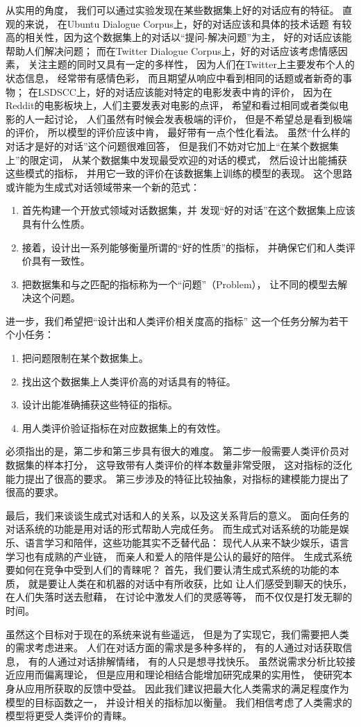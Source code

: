从实用的角度，
我们可以通过实验发现在某些数据集上好的对话应有的特征。
直观的来说，
在Ubuntu Dialogue Corpus上，好的对话应该和具体的技术话题
有较高的相关性，因为这个数据集上的对话以“提问-解决问题”为主，
好的对话应该能帮助人们解决问题；
而在Twitter Dialogue Corpus上，好的对话应该考虑情感因素，
关注主题的同时又具有一定的多样性，
因为人们在Twitter上主要发布个人的状态信息，
经常带有感情色彩，
而且期望从响应中看到相同的话题或者新奇的事物；
在LSDSCC上，好的对话应该能对特定的电影发表中肯的评价，
因为在Reddit的电影板块上，人们主要发表对电影的点评，
希望和看过相同或者类似电影的人一起讨论，
人们虽然有时候会发表极端的评价，
但是不希望总是看到极端的评价，
所以模型的评价应该中肯，
最好带有一点个性化看法。
虽然“什么样的对话才是好的对话”这个问题很难回答，
但是我们不妨对它加上“在某个数据集上”的限定词，
从某个数据集中发现最受欢迎的对话的模式，
然后设计出能捕获这些模式的指标，
并用它一致的评价在该数据集上训练的模型的表现。
这个思路或许能为生成式对话领域带来一个新的范式：
\begin{enumerate}
    \item 首先构建一个开放式领域对话数据集，并
    发现“好的对话”在这个数据集上应该具有什么性质。
    \item 接着，设计出一系列能够衡量所谓的“好的性质”的指标，
    并确保它们和人类评价具有一致性。
    \item 把数据集和与之匹配的指标称为一个“问题”（Problem），
    让不同的模型去解决这个问题。
\end{enumerate}

进一步，我们希望把“设计出和人类评价相关度高的指标”
这一个任务分解为若干个小任务：
\begin{enumerate}
    \item 把问题限制在某个数据集上。
    \item 找出这个数据集上人类评价高的对话具有的特征。
    \item 设计出能准确捕获这些特征的指标。
    \item 用人类评价验证指标在对应数据集上的有效性。
\end{enumerate}

必须指出的是，第二步和第三步具有很大的难度。
第二步一般需要人类评价员对数据集的样本打分，
这导致带有人类评价的样本数量非常受限，
这对指标的泛化能力提出了很高的要求。
第三步涉及的特征比较抽象，对指标的建模能力提出了很高的要求。

最后，我们来谈谈生成式对话和人的关系，以及这关系背后的意义。
面向任务的对话系统的功能是用对话的形式帮助人完成任务。
而生成式对话系统的功能是娱乐、语言学习和陪伴，这些功能其实不乏替代品：
现代人从来不缺少娱乐，语言学习也有成熟的产业链，
而亲人和爱人的陪伴是公认的最好的陪伴。
生成式系统要如何在竞争中受到人们的青睐呢？
首先，我们要认清生成式系统的功能的本质，
就是要让人类在和机器的对话中有所收获，比如
让人们感受到聊天的快乐，
在人们失落时送去慰藉，
在讨论中激发人们的灵感等等，
而不仅仅是打发无聊的时间。

虽然这个目标对于现在的系统来说有些遥远，
但是为了实现它，我们需要把人类的需求考虑进来。
人们在对话方面的需求是多种多样的，
有的人通过对话获取信息，
有的人通过对话排解情绪，
有的人只是想寻找快乐。
虽然说需求分析比较接近应用而偏离理论，
但是应用和理论相结合能增加研究成果的实用性，
使研究本身从应用所获取的反馈中受益。
因此我们建议把最大化人类需求的满足程度作为模型的目标函数之一，
并设计相关的指标加以衡量。
我们相信考虑了人类需求的模型将更受人类评价的青睐。
